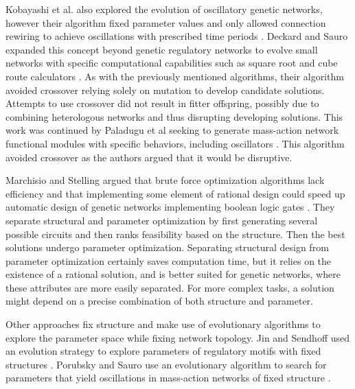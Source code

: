 \documentclass[12pt]{report}
\begin{document}
Kobayashi et al. also explored the evolution of oscillatory genetic networks, however their algorithm fixed parameter values and only allowed connection rewiring to achieve oscillations with prescribed time periods \cite{kobayashi_evolutionary_2010}. Deckard and Sauro expanded this concept beyond genetic regulatory networks to evolve small networks with specific computational capabilities such as square root and cube route calculators \cite{deckard_preliminary_2004}. As with the previously mentioned algorithms, their algorithm avoided crossover relying solely on mutation to develop candidate solutions. Attempts to use crossover did not result in fitter offspring, possibly due to combining heterologous networks and thus disrupting developing solutions. This work was continued by Paladugu et al seeking to generate mass-action network functional modules with specific behaviors, including oscillators \cite{Paladugu2006}.  This algorithm avoided crossover as the authors argued that it would be disruptive.

Marchisio and Stelling argued that brute force optimization algorithms lack efficiency and that implementing some element of rational design could speed up automatic design of genetic networks implementing boolean logic gates \cite{marchisio_automatic_2011}. They separate structural and parameter optimization by first generating several possible circuits and then ranks feasibility based on the structure. Then the best solutions undergo parameter optimization. Separating structural design from parameter optimization certainly saves computation time, but it relies on the existence of a rational solution, and is better suited for genetic networks, where these attributes are more easily separated. For more complex tasks, a solution might depend on a precise combination of both structure and parameter.

Other approaches fix structure and make use of evolutionary algorithms to explore the parameter space while fixing network topology. Jin and Sendhoff used an evolution strategy to explore parameters of regulatory motifs with fixed structures \cite{jin_evolving_2008}. Porubsky and Sauro use an evolutionary algorithm to search for parameters that yield oscillations in mass-action networks of fixed structure \cite{porubsky2019}.
\end{document}
